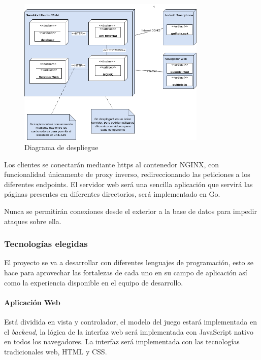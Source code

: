 \documentclass{article}
\begin{document}
\begin{figure}[htb]
    \centering
    \includegraphics[width=0.8\textwidth]{./images/diagrama_despliegue.png}
    \caption{Diagrama de despliegue}
    \label{fig:diag_despliegue}
\end{figure}

Los clientes se conectarán mediante https al contenedor NGINX, con funcionalidad
únicamente de proxy inverso, redireccionando las peticiones a los diferentes endpoints.
El servidor web será una sencilla aplicación que servirá las páginas presentes
en diferentes directorios, será implementado en Go.

Nunca se permitirán conexiones desde el exterior a la base de datos para impedir ataques sobre ella. 

\FloatBarrier
\subsubsection{Tecnologías elegidas}

El proyecto se va a desarrollar con diferentes lenguajes de programación, esto se hace para aprovechar las 
fortalezas de cada uno en su campo de aplicación así como la experiencia disponible en el equipo de desarrollo.


\paragraph*{Aplicación Web}

Está dividida en vista y controlador, el modelo del juego estará implementada en el \textit{backend}, 
la lógica de la interfaz web será implementada con JavaScript nativo en todos los navegadores. 
La interfaz será implementada con las tecnologías tradicionales web, HTML y CSS.
\end{document}
